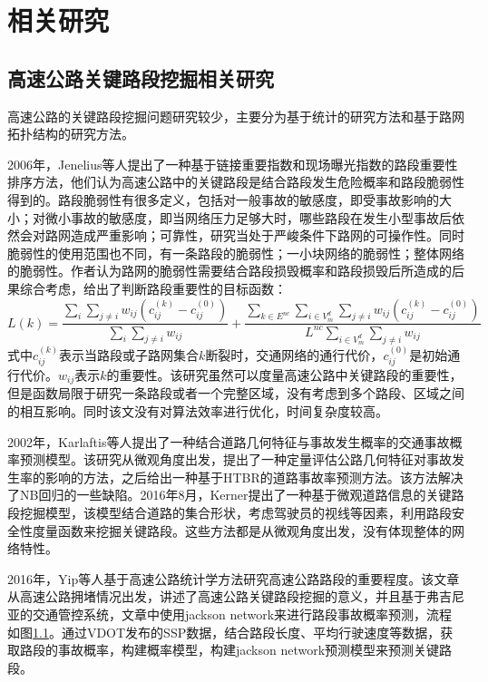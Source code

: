 
\chapter{相关研究}

\section{高速公路关键路段挖掘相关研究}
	高速公路的关键路段挖掘问题研究较少，主要分为基于统计的研究方法和基于路网拓扑结构的研究方法。

	2006年，Jenelius等人提出了一种基于链接重要指数和现场曝光指数的路段重要性排序方法\parencite{Jenelius2006Importance}，他们认为高速公路中的关键路段是结合路段发生危险概率和路段脆弱性得到的。路段脆弱性有很多定义，包括对一般事故的敏感度，即受事故影响的大小；对微小事故的敏感度，即当网络压力足够大时，哪些路段在发生小型事故后依然会对路网造成严重影响；可靠性，研究当处于严峻条件下路网的可操作性。同时脆弱性的使用范围也不同，有一条路段的脆弱性；一小块网络的脆弱性；整体网络的脆弱性。作者认为路网的脆弱性需要结合路段损毁概率和路段损毁后所造成的后果综合考虑，给出了判断路段重要性的目标函数：
	$$L(k)=\frac{{\sum\limits_i {\sum\limits_{j \ne i} {{w_{ij}}(c_{ij}^{(k)} - c_{ij}^{(0)})} } }}{{\sum\limits_i {\sum\limits_{j \ne i} {{w_{ij}}} } }} + \frac{{\sum\limits_{k \in {E^{nc}}} {\sum\limits_{i \in V_m^d} {\sum\limits_{j \ne i} {{w_{ij}}(c_{ij}^{(k)} - c_{ij}^{(0)})} } } }}{{{L^{nc}}\sum\limits_{i \in V_m^d} {\sum\limits_{j \ne i} {{w_{ij}}} } }}$$
	式中$c_{ij}^{(k)}$表示当路段或子路网集合$k$断裂时，交通网络的通行代价，$c_{ij}^{(0)}$是初始通行代价。$w_{ij}$表示$k$的重要性。该研究虽然可以度量高速公路中关键路段的重要性，但是函数局限于研究一条路段或者一个完整区域，没有考虑到多个路段、区域之间的相互影响。同时该文没有对算法效率进行优化，时间复杂度较高。

	2002年，Karlaftis等人提出了一种结合道路几何特征与事故发生概率的交通事故概率预测模型\parencite{Karlaftis2002Effects}。该研究从微观角度出发，提出了一种定量评估公路几何特征对事故发生率的影响的方法，之后给出一种基于HTBR的道路事故率预测方法。该方法解决了NB回归的一些缺陷。2016年8月，Kerner提出了一种基于微观道路信息的关键路段挖掘模型\parencite{Kerner2015The}，该模型结合道路的集合形状，考虑驾驶员的视线等因素，利用路段安全性度量函数来挖掘关键路段。这些方法都是从微观角度出发，没有体现整体的网络特性。

	2016年，Yip等人基于高速公路统计学方法\parencite{YipTongji}研究高速公路路段的重要程度。该文章从高速公路拥堵情况出发，讲述了高速公路关键路段挖掘的意义，并且基于弗吉尼亚的交通管控系统，文章中使用jackson network来进行路段事故概率预测，流程如图\ref{}。通过VDOT发布的SSP数据，结合路段长度、平均行驶速度等数据，获取路段的事故概率，构建概率模型，构建jackson network预测模型来预测关键路段。

